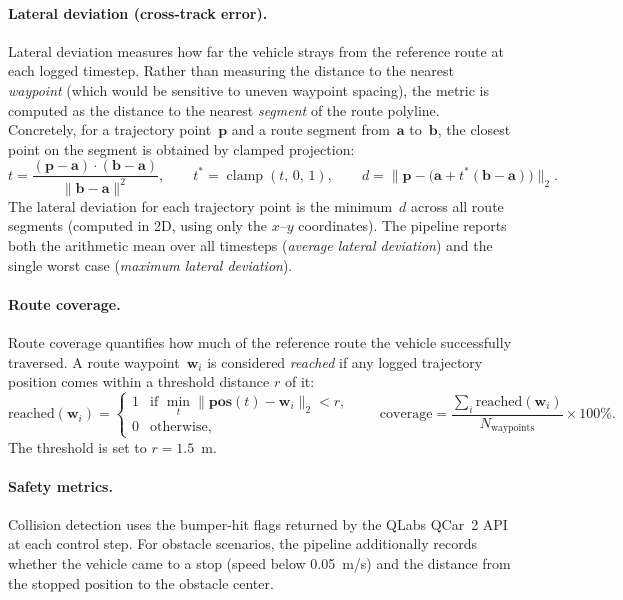 \paragraph{Lateral deviation (cross-track error).}
Lateral deviation measures how far the vehicle strays from the reference route at each logged timestep. Rather than measuring the distance to the nearest \emph{waypoint} (which would be sensitive to uneven waypoint spacing), the metric is computed as the distance to the nearest \emph{segment} of the route polyline. Concretely, for a trajectory point~$\mathbf{p}$ and a route segment from~$\mathbf{a}$ to~$\mathbf{b}$, the closest point on the segment is obtained by clamped projection:
\begin{equation}
\label{eq:lateral-dev}
t = \frac{(\mathbf{p}-\mathbf{a})\cdot(\mathbf{b}-\mathbf{a})}{\lVert\mathbf{b}-\mathbf{a}\rVert^2},\qquad
t^{*}=\operatorname{clamp}(t,\,0,\,1),\qquad
d = \lVert\mathbf{p} - \bigl(\mathbf{a}+t^{*}(\mathbf{b}-\mathbf{a})\bigr)\rVert_2.
\end{equation}
The lateral deviation for each trajectory point is the minimum~$d$ across all route segments (computed in 2D, using only the $x$--$y$ coordinates). The pipeline reports both the arithmetic mean over all timesteps (\emph{average lateral deviation}) and the single worst case (\emph{maximum lateral deviation}).

\paragraph{Route coverage.}
Route coverage quantifies how much of the reference route the vehicle successfully traversed. A route waypoint~$\mathbf{w}_i$ is considered \emph{reached} if any logged trajectory position comes within a threshold distance $r$ of it:
\begin{equation}
\label{eq:route-coverage}
\text{reached}(\mathbf{w}_i) = \begin{cases}1 & \text{if } \min_{t}\lVert\mathbf{pos}(t)-\mathbf{w}_i\rVert_2 < r,\\0 & \text{otherwise,}\end{cases}
\qquad
\text{coverage} = \frac{\sum_i \text{reached}(\mathbf{w}_i)}{N_{\text{waypoints}}}\times 100\%.
\end{equation}
The threshold is set to $r=1.5$~m.

\paragraph{Safety metrics.}
Collision detection uses the bumper-hit flags returned by the QLabs QCar~2 API at each control step. For obstacle scenarios, the pipeline additionally records whether the vehicle came to a stop (speed below 0.05~m/s) and the distance from the stopped position to the obstacle center.

